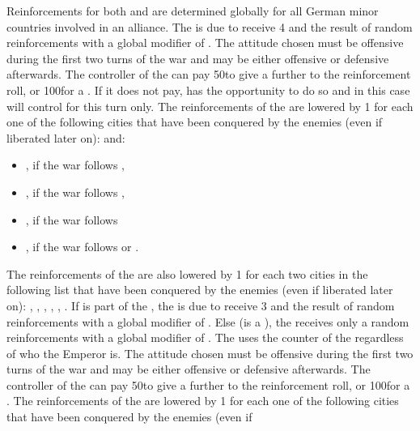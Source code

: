 \begin{digressions}
  \phadm
  \aparag Reinforcements for both \alliance and \ligue are determined globally
  for all German minor countries involved in an alliance.
  \aparag The \alliance is due to receive 4 \LD and the result of random
  reinforcements with a global modifier of .
  \bparag The attitude chosen must be offensive during the first two turns of
  the war and may be either offensive or defensive afterwards.
  \aparag The controller of the \alliance can pay 50\ducats to give a further
   to the reinforcement roll, or 100\ducats for a . If it
  does not pay, \SUE has the opportunity to do so and in this case will
  control \alliance for this turn only.
  \aparag The reinforcements of the \alliance are lowered by 1 \LD for each
  one of the following cities that have been conquered by the enemies (even if
  liberated later on): \villeMagdeburg and:
  \begin{itemize}
  \item \villeStuttgart, \villeErfurt if the war follows
    ,
  \item \villeMunster, \villeRostock if the war follows ,
  \item \villeSpeyer, \villePrague if the war follows 
  \item \villeBrunswick, \villeWeimar if the war follows
     or .
  \end{itemize}
  \aparag The reinforcements of the \alliance are also lowered by 1 \LD for
  each two cities in the following list that have been conquered by the
  enemies (even if liberated later on): \villeHannover, \villeCassel,
  \villeDresden, \villeBerlin, \villeLubeck, \villeHamburg.
  \aparag If \AUSmin is part of the \ligue, the \ligue is due to receive 3 \LD
  and the result of random reinforcements with a global modifier of
  . Else (\AUS is a \MAJ), the \ligue receives only a random
  reinforcements with a global modifier of .  The \ligue uses the
  \ARMY counter of the \HRE regardless of who the Emperor is.
  \bparag The attitude chosen must be offensive during the first two turns of
  the war and may be either offensive or defensive afterwards.
  \aparag The controller of the \ligue can pay 50\ducats to give a further
   to the reinforcement roll, or 100\ducats for a .
  \aparag The reinforcements of the \ligue are lowered by 1 \LD for each one
  of the following cities that have been conquered by the enemies (even if

\end{digressions}
